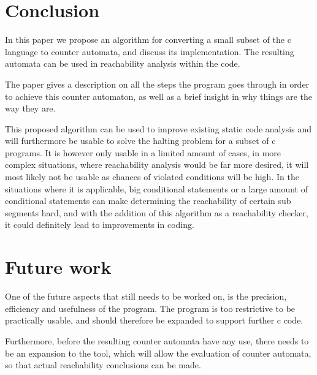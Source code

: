\documentclass[12pt]{article}
\begin{document}
\section{Conclusion}
In this paper we propose an algorithm for converting a small subset of the c language to counter automata, and discuss its implementation. The resulting automata can be used in reachability analysis within the code. 

The paper gives a description on all the steps the program goes through in order to achieve this counter automaton, as well as a brief insight in why things are the way they are.

This proposed algorithm can be used to improve existing static code analysis and will furthermore be usable to solve the halting problem for a subset of c programs. It is however only usable in a limited amount of cases, in more complex situations, where reachability analysis would be far more desired, it will most likely not be usable as chances of violated conditions will be high. In the situations where it is applicable, big conditional statements or a large amount of conditional statements can make determining the reachability of certain sub segments hard, and with the addition of this algorithm as a reachability checker, it could definitely lead to improvements in coding.

\section{Future work}
One of the future aspects that still needs to be worked on, is the precision, efficiency and usefulness of the program. The program is too restrictive to be practically usable, and should therefore be expanded to support further c code.

Furthermore, before the resulting counter automata have any use, there needs to be an expansion to the tool, which will allow the evaluation of counter automata, so that actual reachability conclusions can be made.
\printbibliography
\end{document}
